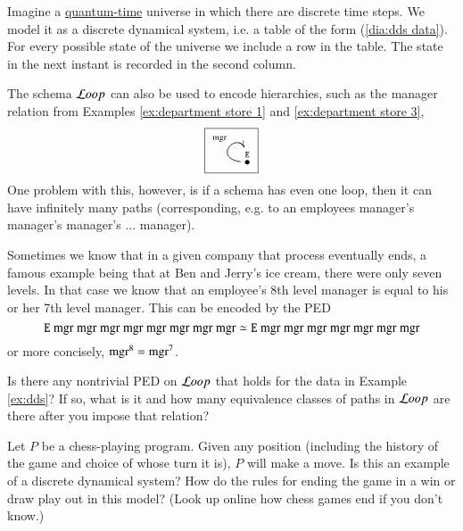 \begin{application}

Imagine a \href{http://en.wikipedia.org/wiki/Chronon}{\text quantum-time} universe in which there are discrete time steps. We model it as a discrete dynamical system, i.e. a table of the form (\ref{dia:dds data}). For every possible state of the universe we include a row in the table. The state in the next instant is recorded in the second column.

\end{application}

\begin{example}\label{ex:finite hierarchy}

The schema ${\mathcal{L} oop}$ can also be used to encode hierarchies, such as the manager relation from Examples \ref{ex:department store 1} and \ref{ex:department store 3}, 
$$\fbox{\xymatrix{\LTO{E}\ar@(l,u)[]^{\tn{mgr}}}}$$
One problem with this, however, is if a schema has even one loop, then it can have infinitely many paths (corresponding, e.g. to an employees manager's manager's manager's ... manager). 

Sometimes we know that in a given company that process eventually ends, a famous example being that at Ben and Jerry's ice cream, there were only seven levels. In that case we know that an employee's 8th level manager is equal to his or her 7th level manager. This can be encoded by the PED $${\tt E} \tn{ mgr}\tn{ mgr}\tn{ mgr}\tn{ mgr}\tn{ mgr}\tn{ mgr}\tn{ mgr}\tn{ mgr}\simeq{\tt E}\tn{ mgr}\tn{ mgr}\tn{ mgr}\tn{ mgr}\tn{ mgr}\tn{ mgr}\tn{ mgr}$$ or more concisely, $\tn{mgr}^8=\tn{mgr}^7$.

\end{example}

\begin{exercise}
Is there any nontrivial PED on ${\mathcal{L} oop}$ that holds for the data in Example \ref{ex:dds}? If so, what is it and how many equivalence classes of paths in ${\mathcal{L} oop}$ are there after you impose that relation?
\end{exercise}

\begin{exercise}
Let $P$ be a chess-playing program. Given any position (including the history of the game and choice of whose turn it is), $P$ will make a move. 
\sexc Is this an example of a discrete dynamical system? 
\next How do the rules for ending the game in a win or draw play out in this model? (Look up online how chess games end if you don't know.)
\endsexc
\end{exercise}

